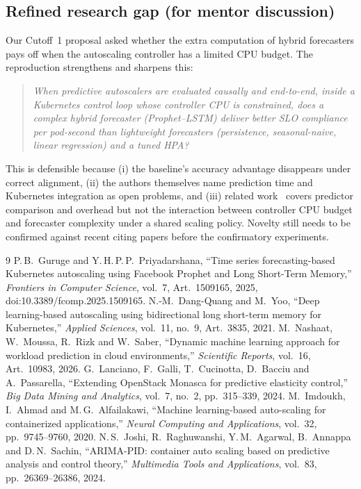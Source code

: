 \documentclass[11pt,a4paper]{article}
\begin{document}
\subsection{Refined research gap (for mentor discussion)}
Our Cutoff~1 proposal asked whether the extra computation of hybrid forecasters pays off when the autoscaling controller has a limited CPU budget. The reproduction strengthens and sharpens this:
\begin{quote}
\emph{When predictive autoscalers are evaluated causally and end-to-end, inside a Kubernetes control loop whose controller CPU is constrained, does a complex hybrid forecaster (Prophet--LSTM) deliver better SLO compliance per pod-second than lightweight forecasters (persistence, seasonal-naive, linear regression) and a tuned HPA?}
\end{quote}
This is defensible because (i) the baseline's accuracy advantage disappears under correct alignment, (ii) the authors themselves name prediction time and Kubernetes integration as open problems, and (iii) related work~\cite{lanciano2024,imdoukh2020,joshi2024} covers predictor comparison and overhead but not the interaction between controller CPU budget and forecaster complexity under a shared scaling policy. Novelty still needs to be confirmed against recent citing papers before the confirmatory experiments.

\begin{thebibliography}{9}
 P.\,B.\ Guruge and Y.\,H.\,P.\,P.\ Priyadarshana, ``Time series forecasting-based Kubernetes autoscaling using Facebook Prophet and Long Short-Term Memory,'' \textit{Frontiers in Computer Science}, vol.\ 7, Art.\ 1509165, 2025, doi:10.3389/fcomp.2025.1509165.
 N.-M.\ Dang-Quang and M.\ Yoo, ``Deep learning-based autoscaling using bidirectional long short-term memory for Kubernetes,'' \textit{Applied Sciences}, vol.\ 11, no.\ 9, Art.\ 3835, 2021.
 M.\ Nashaat, W.\ Moussa, R.\ Rizk and W.\ Saber, ``Dynamic machine learning approach for workload prediction in cloud environments,'' \textit{Scientific Reports}, vol.\ 16, Art.\ 10983, 2026.
 G.\ Lanciano, F.\ Galli, T.\ Cucinotta, D.\ Bacciu and A.\ Passarella, ``Extending OpenStack Monasca for predictive elasticity control,'' \textit{Big Data Mining and Analytics}, vol.\ 7, no.\ 2, pp.\ 315--339, 2024.
 M.\ Imdoukh, I.\ Ahmad and M.\,G.\ Alfailakawi, ``Machine learning-based auto-scaling for containerized applications,'' \textit{Neural Computing and Applications}, vol.\ 32, pp.\ 9745--9760, 2020.
 N.\,S.\ Joshi, R.\ Raghuwanshi, Y.\,M.\ Agarwal, B.\ Annappa and D.\,N.\ Sachin, ``ARIMA-PID: container auto scaling based on predictive analysis and control theory,'' \textit{Multimedia Tools and Applications}, vol.\ 83, pp.\ 26369--26386, 2024.
\end{thebibliography}
\end{document}

